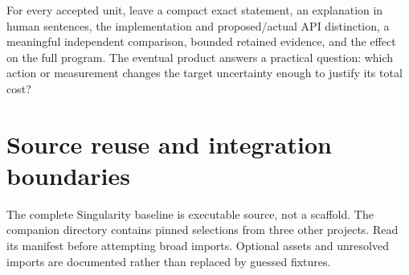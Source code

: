 \documentclass[
  11pt,
  a4paper,
]{report}
\begin{document}
For every accepted unit, leave a compact exact statement, an explanation
in human sentences, the implementation and proposed/actual API
distinction, a meaningful independent comparison, bounded retained
evidence, and the effect on the full program. The eventual product
answers a practical question: which action or measurement changes the
target uncertainty enough to justify its total cost?

\hypertarget{source-reuse-and-integration-boundaries}{%
\chapter{Source reuse and integration
boundaries}\label{source-reuse-and-integration-boundaries}}

The complete Singularity baseline is executable source, not a scaffold.
The companion directory contains pinned selections from three other
projects. Read its manifest before attempting broad imports. Optional
assets and unresolved imports are documented rather than replaced by
guessed fixtures.
\end{document}
